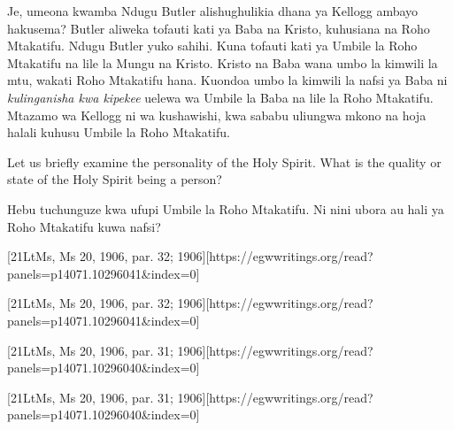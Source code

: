 Je, umeona kwamba Ndugu Butler alishughulikia dhana ya Kellogg ambayo hakusema? Butler aliweka tofauti kati ya Baba na Kristo, kuhusiana na Roho Mtakatifu. Ndugu Butler yuko sahihi. Kuna tofauti kati ya Umbile la Roho Mtakatifu na lile la Mungu na Kristo. Kristo na Baba wana umbo la kimwili la mtu, wakati Roho Mtakatifu hana. Kuondoa umbo la kimwili la nafsi ya Baba ni \textit{kulinganisha kwa kipekee} uelewa wa Umbile la Baba na lile la Roho Mtakatifu. Mtazamo wa Kellogg ni wa kushawishi, kwa sababu uliungwa mkono na hoja halali kuhusu Umbile la Roho Mtakatifu.


Let us briefly examine the personality of the Holy Spirit. What is the quality or state of the Holy Spirit being a person?


Hebu tuchunguze kwa ufupi Umbile la Roho Mtakatifu. Ni nini ubora au hali ya Roho Mtakatifu kuwa nafsi?


[21LtMs, Ms 20, 1906, par. 32; 1906][https://egwwritings.org/read?panels=p14071.10296041&index=0]


[21LtMs, Ms 20, 1906, par. 32; 1906][https://egwwritings.org/read?panels=p14071.10296041&index=0]


[21LtMs, Ms 20, 1906, par. 31; 1906][https://egwwritings.org/read?panels=p14071.10296040&index=0]


[21LtMs, Ms 20, 1906, par. 31; 1906][https://egwwritings.org/read?panels=p14071.10296040&index=0]


